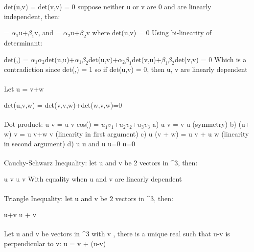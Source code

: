 \documentclass{article}
\begin{document}
\math det(u,v) = \alpha det(v,v) = 0 \)
\newline suppose neither u or v are 0 and are linearly independent, then:

\newline \math {} = $\alpha_1$u+$\beta_1$v\), and  = $\alpha_2$u+$\beta_2$v\) where \math det(u,v) = 0\)
\newline Using bi-linearity of determinant:

\math det(,) = $\alpha_1$$\alpha_2$det(u,u)+$\alpha_1$$\beta_2$det(u,v)+$\alpha_2$$\beta_1$det(v,u)+$\beta_1$$\beta_2$det(v,v)
= 0\)
\newline Which is a contradiction since \math det(,) = 1\) so if \math det(u,v) = 0\), then u, v are linearly dependent
\\
\\
Let \math u = \alpha v+\beta w

det(u,v,w) = \alpha det(v,v,w)+\beta det(w,v,w)=0\)
\\
\\
Dot product: \math u \cdot v = \vert u \vert \vert v \vert cos(\phi) = $u_1$$v_1$+$u_2$$v_2$+$u_3$$v_3$\)
\newline a) \math u \cdot v = v \cdot u\) (symmetry)
\newline b) \math (\lambda u+ \mu w) \cdot v = \lambda u \cdot v+\mu w \cdot v\) (linearity in first argument)
\newline c) \math u \cdot (\lambda v + \mu w) = \lambda u \cdot v + \mu u \cdot w\) (linearity in second argument)
\newline d) \math u \cdot u \) and \math u \cdot u=0 \Leftrightarrow u=0\)
\\
\\
Cauchy-Schwarz Inequality: let u and v be 2 vectors in \Re^3\), then:

\math \vert u \cdot v \vert \leq \vert u \vert \vert v \vert \)
\newline With equality when u and v are linearly dependent
\\
\\
Triangle Inequality: let u and v be 2 vectors in \Re^3\), then:

\math \vert u+v \vert \leq \vert u \vert + \vert v \vert\)
\\
\\
Let u and v be vectors in \Re^3\) with v \), there is a unique real \lambda\) such that \math u-\lambda v\) is perpendicular to v: \math u = \lambda v + (u-\lambda v)
\end{document}
